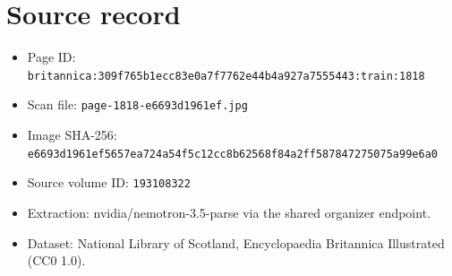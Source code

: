 \documentclass{article}
\begin{document}
\section*{Source record}
\begin{itemize}
\item Page ID: \texttt{britannica:309f765b1ecc83e0a7f7762e44b4a927a7555443:train:1818}
\item Scan file: \texttt{page-1818-e6693d1961ef.jpg}
\item Image SHA-256: \texttt{e6693d1961ef5657ea724a54f5c12cc8b62568f84a2ff587847275075a99e6a0}
\item Source volume ID: \texttt{193108322}
\item Extraction: nvidia/nemotron-3.5-parse via the shared organizer endpoint.
\item Dataset: National Library of Scotland, Encyclopaedia Britannica Illustrated (CC0 1.0).
\end{itemize}
\end{document}
